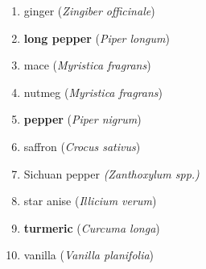 \begin{multicols}{2}
\begin{enumerate}
    \item ginger (\textit{Zingiber officinale}) %
    \item \textbf{long pepper} (\textit{Piper longum}) \quad \hfill \pageref{sec:long_pepper}
    \item mace (\textit{Myristica fragrans}) %
    \item nutmeg (\textit{Myristica fragrans}) %
	\item \textbf{pepper} (\textit{Piper nigrum}) \quad \hfill \pageref{sec:pepper}
    \item saffron (\textit{Crocus sativus}) %
    \item Sichuan pepper \textit{(Zanthoxylum spp.)} %
    \item star anise (\textit{Illicium verum}) %
    \item \textbf{turmeric} (\textit{Curcuma longa}) \quad \hfill \pageref{sec:turmeric}
    \item vanilla (\textit{Vanilla planifolia}) %
\end{enumerate}
\end{multicols}

\setlength{\tabcolsep}{4pt}

